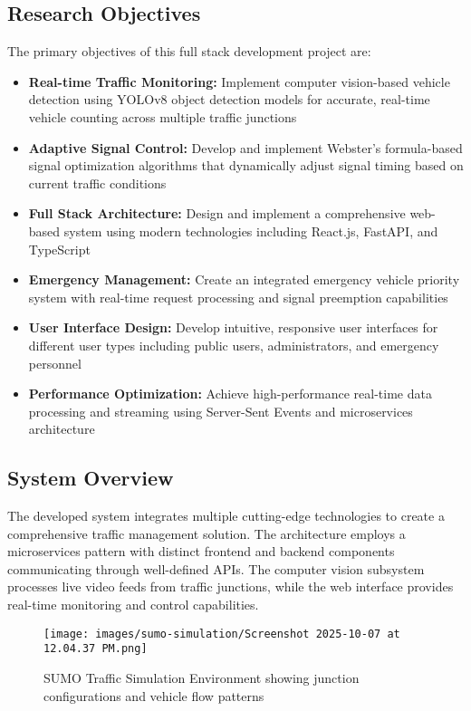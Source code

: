 \documentclass[conference]{IEEEtran}
\begin{document}
\subsection{Research Objectives}

The primary objectives of this full stack development project are:

\begin{itemize}
\item \textbf{Real-time Traffic Monitoring:} Implement computer vision-based vehicle detection using YOLOv8 object detection models for accurate, real-time vehicle counting across multiple traffic junctions
\item \textbf{Adaptive Signal Control:} Develop and implement Webster's formula-based signal optimization algorithms that dynamically adjust signal timing based on current traffic conditions
\item \textbf{Full Stack Architecture:} Design and implement a comprehensive web-based system using modern technologies including React.js, FastAPI, and TypeScript
\item \textbf{Emergency Management:} Create an integrated emergency vehicle priority system with real-time request processing and signal preemption capabilities
\item \textbf{User Interface Design:} Develop intuitive, responsive user interfaces for different user types including public users, administrators, and emergency personnel
\item \textbf{Performance Optimization:} Achieve high-performance real-time data processing and streaming using Server-Sent Events and microservices architecture
\end{itemize}

\subsection{System Overview}

The developed system integrates multiple cutting-edge technologies to create a comprehensive traffic management solution. The architecture employs a microservices pattern with distinct frontend and backend components communicating through well-defined APIs. The computer vision subsystem processes live video feeds from traffic junctions, while the web interface provides real-time monitoring and control capabilities.

\begin{figure}[H]
\centering
\texttt{[image: images/sumo-simulation/Screenshot 2025-10-07 at 12.04.37 PM.png]}
\caption{SUMO Traffic Simulation Environment showing junction configurations and vehicle flow patterns}
\label{fig:sumo_simulation}
\end{figure}
\end{document}
